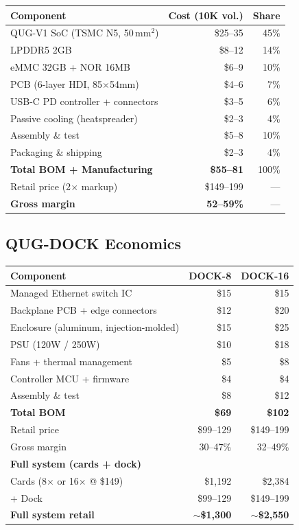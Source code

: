 \documentclass[11pt,a4paper]{article}
\begin{document}
\begin{center}
\begin{tabular}{@{}lrr@{}}
\toprule
\textbf{Component} & \textbf{Cost (10K vol.)} & \textbf{Share} \\
\midrule
QUG-V1 SoC (TSMC N5, 50\,mm$^2$) & \$25--35 & 45\% \\
LPDDR5 2GB & \$8--12 & 14\% \\
eMMC 32GB + NOR 16MB & \$6--9 & 10\% \\
PCB (6-layer HDI, 85$\times$54mm) & \$4--6 & 7\% \\
USB-C PD controller + connectors & \$3--5 & 6\% \\
Passive cooling (heatspreader) & \$2--3 & 4\% \\
Assembly \& test & \$5--8 & 10\% \\
Packaging \& shipping & \$2--3 & 4\% \\
\midrule
\textbf{Total BOM + Manufacturing} & \textbf{\$55--81} & 100\% \\
\midrule
Retail price (2$\times$ markup) & \$149--199 & --- \\
\textbf{Gross margin} & \textbf{52--59\%} & --- \\
\bottomrule
\end{tabular}
\end{center}

\subsection{QUG-DOCK Economics}

\begin{center}
\begin{tabular}{@{}lrr@{}}
\toprule
\textbf{Component} & \textbf{DOCK-8} & \textbf{DOCK-16} \\
\midrule
Managed Ethernet switch IC & \$15 & \$15 \\
Backplane PCB + edge connectors & \$12 & \$20 \\
Enclosure (aluminum, injection-molded) & \$15 & \$25 \\
PSU (120W / 250W) & \$10 & \$18 \\
Fans + thermal management & \$5 & \$8 \\
Controller MCU + firmware & \$4 & \$4 \\
Assembly \& test & \$8 & \$12 \\
\midrule
\textbf{Total BOM} & \textbf{\$69} & \textbf{\$102} \\
Retail price & \$99--129 & \$149--199 \\
Gross margin & 30--47\% & 32--49\% \\
\midrule
\textbf{Full system (cards + dock)} & & \\
Cards (8$\times$ or 16$\times$ @ \$149) & \$1{,}192 & \$2{,}384 \\
+ Dock & \$99--129 & \$149--199 \\
\textbf{Full system retail} & \textbf{$\sim$\$1{,}300} & \textbf{$\sim$\$2{,}550} \\
\bottomrule
\end{tabular}
\end{center}
\end{document}

